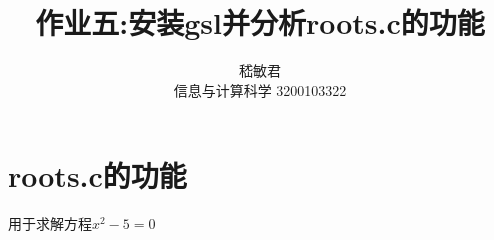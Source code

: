 \documentclass{ctexart}
\title{作业五:安装gsl并分析roots.c的功能}
\author{嵇敏君 \\信息与计算科学 3200103322 }
\begin{document}
\maketitle


\section{roots.c的功能}
用于求解方程$x^2-5=0$
\end{document}
